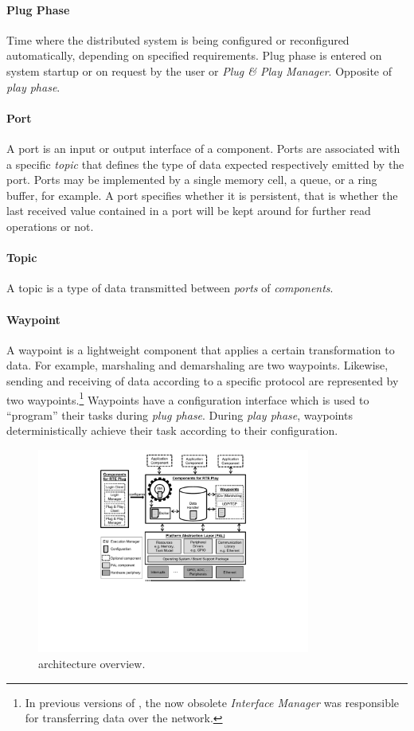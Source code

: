 \paragraph{Plug Phase}
Time where the distributed system is being configured or reconfigured automatically, depending on specified requirements.
Plug phase is entered on system startup or on request by the user or \emph{Plug \& Play Manager}.
Opposite of \emph{play phase}.

\paragraph{Port}
A port is an input or output interface of a component.
Ports are associated with a specific \emph{topic} that defines the type of data expected respectively emitted by the port.
Ports may be implemented by a single memory cell, a queue, or a ring buffer, for example.
A port specifies whether it is persistent, that is whether the last received value contained in a port will be kept around for further read operations or not.

\paragraph{Topic}
A topic is a type of data transmitted between \emph{ports} of \emph{components}.

\paragraph{Waypoint}
A waypoint is a lightweight component that applies a certain transformation to data.
For example, marshaling and demarshaling are two waypoints.
Likewise, sending and receiving of data according to a specific protocol are represented by two waypoints.\footnote{%
	In previous versions of \xme, the now obsolete \emph{Interface Manager} was responsible for transferring data over the network.
}
Waypoints have a configuration interface which is used to ``program'' their tasks during \emph{plug phase}.
During \emph{play phase}, waypoints deterministically achieve their task according to their configuration.

\begin{figure}[htb]
	\centering
	\includegraphics[width=0.8\textwidth,trim=166 190 166 5]{figures/architecture.pdf}
	\caption{\xme architecture overview.}
	\label{fig:architecture}
\end{figure}



